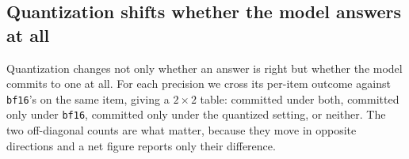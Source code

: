 \documentclass[11pt]{article}
\begin{document}


\subsection{Quantization shifts whether the model answers at all}
\label{sec:h4}
%
Quantization changes not only whether an answer is right but whether the model
commits to one at all. For each precision we cross its per-item outcome against
\texttt{bf16}'s on the same item, giving a $2\times2$ table: committed under both,
committed only under \texttt{bf16}, committed only under the quantized setting, or
neither. The two off-diagonal counts are what matter, because they move in opposite
directions and a net figure reports only their difference.

\begin{table}[t]
\centering
\small

\caption{Compliance transitions against \texttt{bf16} on the same items, pooled over
the three models, at \hFourRung{} extraction. \emph{chg.} is the number of items that
changed commitment state in either direction; \emph{net} is the resulting change in
commitment rate in percentage points; $\neq$0 counts how many of the underlying
per-model cells exclude the null under an exact McNemar test. \textbf{Bold} marks a net
with at least one such cell. $^{*}$GSM8K\textsubscript{hash} is shown as a demonstration
and excluded from the registered family (\S\ref{sec:h3}).}
\label{tab:h4-transitions}
\end{table}
\end{document}
